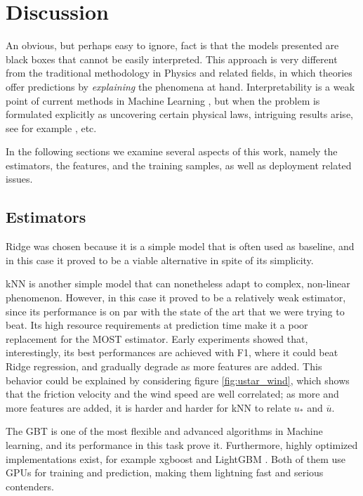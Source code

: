 \documentclass[a4paper,11pt]{kth-mag}
\begin{document}
\section{Discussion}
\label{sec:discussion}
An obvious, but perhaps easy to ignore, fact is that the models presented are black boxes that cannot be easily interpreted. This approach is very different from the traditional methodology in Physics and related fields, in which theories offer predictions by \emph{explaining} the phenomena at hand. Interpretability is a weak point of current methods in Machine Learning \citep{interpret_ml}, but when the problem is formulated explicitly as uncovering certain physical laws, intriguing results arise, see for example \cite{ml_diff_eq}, \cite{learn_eqs} etc.

In the following sections we examine several aspects of this work, namely the estimators, the features, and the training samples, as well as deployment related issues.

\subsection{Estimators}
Ridge was chosen because it is a simple model that is often used as baseline, and in this case it proved to be a viable alternative in spite of its simplicity.

kNN is another simple model that can nonetheless adapt to complex, non-linear phenomenon. However, in this case it proved to be a relatively weak estimator, since its performance is on par with the state of the art that we were trying to beat. Its high resource requirements at prediction time make it a poor replacement for the MOST estimator. Early experiments showed that, interestingly, its best performances are achieved with F1, where it could beat Ridge regression, and gradually degrade as more features are added. This behavior could be explained by considering figure \ref{fig:ustar_wind}, which shows that the friction velocity and the wind speed are well correlated; as more and more features are added, it is harder and harder for kNN to relate $u_*$ and $\overline{u}$.

The GBT is one of the most flexible and advanced algorithms in Machine learning, and its performance in this task prove it. Furthermore, highly optimized implementations exist, for example xgboost \citep{xgboost} and LightGBM \citep{lightgbm}. Both of them use GPUs for training and prediction, making them lightning fast and serious contenders.
\end{document}
